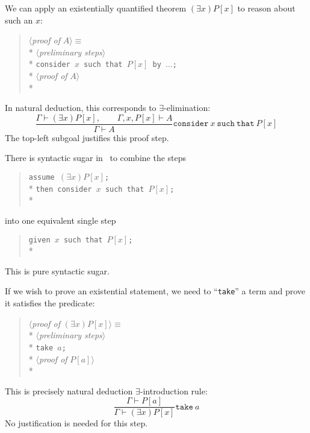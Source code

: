 \begin{node}\label{mizar-000B}%
We can apply an existentially quantified theorem $(\exists x) P[x]$ to
reason about such an $x$:
\begin{verse}
$\langle$\emph{proof of \/}$A\rangle \equiv$\\*
\qquad $\langle$\emph{preliminary steps\/}$\rangle$\\*
\qquad \texttt{consider }$x$\texttt{ such that }$P[x]$\texttt{ by }$\ldots$\texttt{;}\\*
\qquad $\langle$\emph{proof of \/}$A\rangle$\\*
\end{verse}
In natural deduction, this corresponds to $\exists$-elimination:
\[\frac{\Gamma\vdash(\exists x)P[x],\qquad\Gamma,x,P[x]\vdash A}{\Gamma\vdash A} \mathtt{consider}~x~\mathtt{such\ that}~P[x]\]
The top-left subgoal justifies this proof step.

\begin{node}[Given = assume + consider]\label{mizar-000D}%
There is syntactic sugar in \Mizar\ to combine the steps
\begin{verse}
\texttt{assume }$(\exists x)P[x]$\texttt{;}\\*
\texttt{then consider }$x$\texttt{ such that }$P[x]$\texttt{;}\\*
\end{verse}
into one equivalent single step
\begin{verse}
\texttt{given }$x$\texttt{ such that }$P[x]$\texttt{;}\\*
\end{verse}
This is pure syntactic sugar.
\end{node}
\end{node}

\begin{node}\label{mizar-000C}%
If we wish to prove an existential statement, we need to
``\texttt{take}'' a term and prove it satisfies the predicate:
\begin{verse}
$\langle$\emph{proof of \/}$(\exists x)P[x]\rangle \equiv$\\*
\qquad $\langle$\emph{preliminary steps\/}$\rangle$\\*
\qquad \texttt{take }$a$\texttt{;}\\*
\qquad $\langle$\emph{proof of \/}$P[a]\rangle$\\*
\end{verse}
This is precisely natural deduction $\exists$-introduction rule:
\[\frac{\Gamma\vdash P[a]}{\Gamma\vdash(\exists x)P[x]}\mathtt{take}~a\]
No justification is needed for this step.
\end{node}

